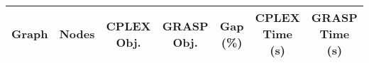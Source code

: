 \begin{tabular}{|l|c|c|c|c|c|c|}
\hline
\textbf{Graph} & \textbf{Nodes} & \textbf{CPLEX Obj.} & \textbf{GRASP Obj.} & \textbf{Gap (\%)} & \textbf{CPLEX Time (s)} & \textbf{GRASP Time (s)} \\
\hline
\hline
\end{tabular}
